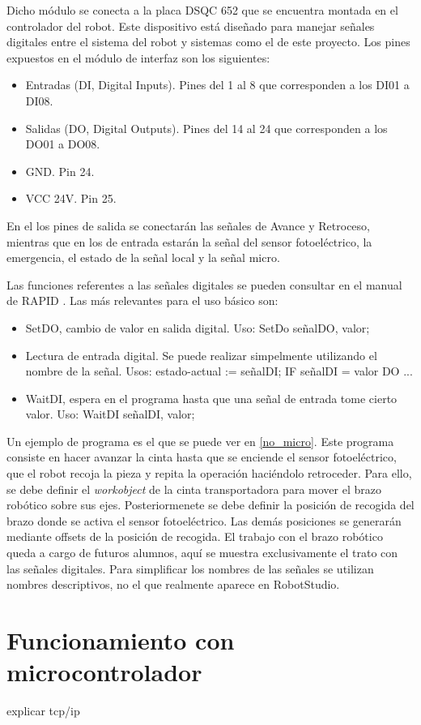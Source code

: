 Dicho módulo se conecta a la placa DSQC 652 que se encuentra montada en el controlador del robot.
Este dispositivo está diseñado para manejar señales digitales entre el sistema del robot y sistemas
como el de este proyecto. Los pines expuestos en el módulo de interfaz son los siguientes:
\begin{itemize}
    \item Entradas (DI, Digital Inputs). Pines del 1 al 8 que corresponden a los DI01 a DI08.
    \item Salidas (DO, Digital Outputs). Pines del 14 al 24 que corresponden a los DO01 a DO08.
    \item GND. Pin 24.
    \item VCC 24V. Pin 25.
\end{itemize}

En el los pines de salida se conectarán las señales de Avance y Retroceso, mientras que en los
de entrada estarán la señal del sensor fotoeléctrico, la emergencia, el estado de la señal local y
la señal micro.

Las funciones referentes a las señales digitales se pueden consultar en el manual de RAPID \cite{rapid}.
Las más relevantes para el uso básico son:
\begin{itemize}
    \item SetDO, cambio de valor en salida digital. Uso: SetDo señalDO, valor;
    \item Lectura de entrada digital. Se puede realizar simpelmente utilizando el nombre de la señal. 
    Usos: estado-actual := señalDI; IF señalDI = valor DO ...
    \item WaitDI, espera en el programa hasta que una señal de entrada tome cierto valor.
    Uso: WaitDI señalDI, valor;
\end{itemize}

Un ejemplo de programa es el que se puede ver en \ref{no_micro}. Este programa consiste en hacer avanzar
la cinta hasta que se enciende el sensor fotoeléctrico, que el robot recoja la pieza y repita la operación
haciéndolo retroceder. Para ello, se debe definir el \textit{workobject} de la cinta transportadora para mover
el brazo robótico sobre sus ejes. Posteriormenete se debe definir la posición de recogida del brazo donde 
se activa el sensor fotoeléctrico. Las demás posiciones se generarán mediante offsets de la posición de recogida.
El trabajo con el brazo robótico queda a cargo de futuros alumnos, aquí se muestra exclusivamente el trato 
con las señales digitales. Para simplificar los nombres de las señales se utilizan nombres descriptivos, no
el que realmente aparece en RobotStudio.



\section{Funcionamiento con microcontrolador}

explicar tcp/ip